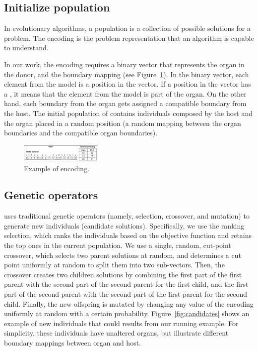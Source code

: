 \subsection{Initialize population}
In evolutionary algorithms, a population is a collection of possible solutions for a problem. The encoding is the problem representation that an algorithm is capable to understand. 

In our work, the encoding requires a binary vector that represents the organ in the donor, and the boundary mapping (see Figure~\ref{fig:encoding}). In the binary vector, each element from the model is a position in the vector. If a position in the vector has a , it means that the element from the model is part of the organ. On the other hand, each boundary from the organ gets assigned a compatible boundary from the host.
The initial population of \ApproachName{} contains individuals composed by the host and the organ placed in a random position (\ie a random mapping between the organ boundaries and the compatible organ boundaries).

\begin{figure}[tb]
    \centering
    \includegraphics[width=0.35\textwidth]{Figures/encoding.png}
    \caption{Example of encoding.}
    \label{fig:encoding}
\end{figure}

\subsection{Genetic operators}
\ApproachName{} uses traditional genetic operators (namely, selection, crossover, and mutation) to generate new individuals (\ie candidate solutions). 
Specifically, we use the ranking selection, which ranks the individuals based on the objective function and retains the top ones in the current population. We use a single, random, cut-point crossover, which selects two parent solutions at random, and determines a cut point uniformly at random to split them into two sub-vectors. Then, the crossover creates two children solutions by combining the first part of the first parent with the second part of the second parent for the first child, and the first part of the second parent with the second part of the first parent for the second child. Finally, the new offspring is mutated by changing any value of the encoding uniformly at random with a certain probability. 
Figure~\ref{fig:candidates} shows an example of new individuals that could results from our running example. For simplicity, these individuals have unaltered organs, but illustrate different boundary mappings between organ and host.

